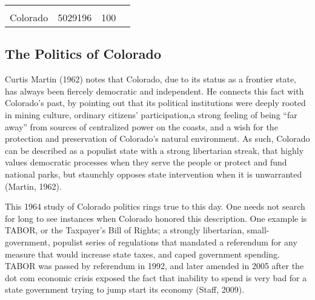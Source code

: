 \documentclass[12pt,twoside]{reedthesis}
\begin{document}
\begin{longtable}[]{@{}lccl@{}}
\begin{minipage}[t]{0.34\columnwidth}
  \strut
  \end{minipage}\tabularnewline
  \begin{minipage}[t]{0.13\columnwidth}\raggedright\strut
  Colorado\strut
  \end{minipage} & \begin{minipage}[t]{0.21\columnwidth}\centering\strut
  5029196\strut
  \end{minipage} & \begin{minipage}[t]{0.20\columnwidth}\centering\strut
  100\strut
  \end{minipage} & \begin{minipage}[t]{0.34\columnwidth}\raggedright\strut
  \strut
  \end{minipage}\tabularnewline
  \bottomrule
  \end{longtable}
  
  \clearpage
  
  \subsection{The Politics of Colorado}\label{the-politics-of-colorado}
  
  Curtis Martin (1962) notes that Colorado, due to its status as a
  frontier state, has always been fiercely democratic and independent. He
  connects this fact with Colorado's past, by pointing out that its
  political institutions were deeply rooted in mining culture, ordinary
  citizens' participation,a strong feeling of being ``far away'' from
  sources of centralized power on the coasts, and a wish for the
  protection and preservation of Colorado's natural environment. As such,
  Colorado can be described as a populist state with a strong libertarian
  streak, that highly values democratic processes when they serve the
  people or protect and fund national parks, but staunchly opposes state
  intervention when it is unwarranted (Martin, 1962).
  
  This 1964 study of Colorado politics rings true to this day. One needs
  not search for long to see instances when Colorado honored this
  description. One example is TABOR, or the Taxpayer's Bill of Rights; a
  strongly libertarian, small-government, populist series of regulations
  that mandated a referendum for any measure that would increase state
  taxes, and caped government spending. TABOR was passed by referendum in
  1992, and later amended in 2005 after the dot com economic crisis
  exposed the fact that inability to spend is very bad for a state
  government trying to jump start its economy (Staff, 2009).
  
\end{document}
